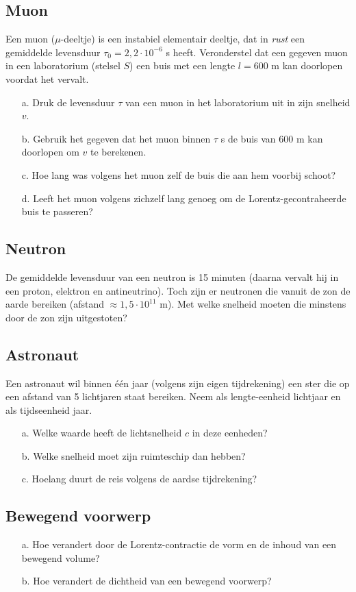 \subsection{Muon}
Een muon ($\mu$-deeltje) is een instabiel elementair deeltje, dat in 
{\it rust} een gemiddelde levensduur $\tau_{0} = 2,2 \cdot 10^{-6}$ s  heeft.  
Veronderstel dat een gegeven muon in een laboratorium (stelsel $S$) een 
buis met een lengte $l =600$ m kan doorlopen voordat het vervalt. 
\begin{itemize}
\item [a.]
  Druk de levensduur $\tau$ van een muon in het laboratorium uit in zijn 
snelheid $v$.
\item [b.]
  Gebruik het gegeven dat het muon binnen $\tau$ s de buis van $600 $ m kan 
doorlopen om $v$ te berekenen. 
\item [c.]
  Hoe lang was volgens het muon zelf de buis die aan hem voorbij schoot? 
\item [d.]
  Leeft het muon volgens zichzelf lang genoeg om de Lorentz-gecontraheerde 
buis te passeren?
\end{itemize}

\subsection{Neutron}
De gemiddelde levensduur van een neutron is 15 minuten 
(daarna vervalt hij in een proton, elektron en antineutrino). 
Toch zijn er neutronen die vanuit de zon de aarde bereiken (afstand 
$\approx 1,5 \cdot 10^{11}$  m). 
  Met welke snelheid moeten die minstens door de zon zijn uitgestoten?

\subsection{Astronaut}
Een astronaut wil binnen \'{e}\'{e}n jaar (volgens zijn eigen tijdrekening) 
een ster die op een afstand van 5 lichtjaren staat bereiken. 
Neem als lengte-eenheid lichtjaar en als tijdseenheid jaar.
\begin{itemize}
\item [a.]
Welke waarde heeft de lichtsnelheid $c$ in deze eenheden?
\item [b.]
Welke snelheid moet zijn ruimteschip dan hebben?
\item [c.]
Hoelang duurt de reis volgens de aardse tijdrekening?
\end{itemize}

\subsection{Bewegend voorwerp}
\begin{itemize}
\item [a.]
  Hoe verandert door de Lorentz-contractie de vorm en de inhoud van een 
bewegend volume?
\item [b.]
  Hoe verandert de dichtheid van een bewegend voorwerp?
\end{itemize}

